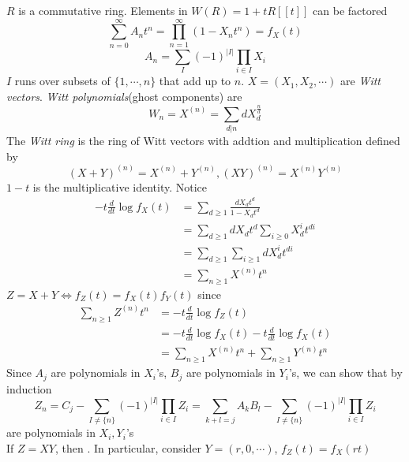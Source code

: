 \documentclass[main]{subfiles}
\begin{document}
\begin{definition}
$R$ is a commutative ring. Elements in $W(R)=1+tR[[t]]$ can be factored
\[\sum_{n=0}^\infty A_nt^n=\prod_{n=1}^\infty(1-X_nt^n)=f_X(t)\]
\[A_n=\sum_{I}(-1)^{|I|}\prod_{i\in I}X_i\]
$I$ runs over subsets of $\{1,\cdots,n\}$ that add up to $n$. $X=(X_1,X_2,\cdots)$ are \textit{Witt vectors}. \textit{Witt polynomials}(ghost components) are
\[W_n=X^{(n)}=\sum_{d|n}dX_d^{\frac{n}{d}}\]
The \textit{Witt ring} is the ring of Witt vectors with addtion and multiplication defined by
\[(X+Y)^{(n)}=X^{(n)}+Y^{(n)},(XY)^{(n)}=X^{(n)}Y^{(n)}\]
$1-t$ is the multiplicative identity. Notice
\begin{align*}
-t\frac{d}{dt}\log f_X(t)&=\sum_{d\geq1}\frac{dX_dt^d}{1-X_dt^d} \\
&=\sum_{d\geq1}dX_dt^d\sum_{i\geq0}X_d^it^{di} \\
&=\sum_{d\geq1}\sum_{i\geq1}dX_d^it^{di} \\
&=\sum_{n\geq1}X^{(n)}t^n
\end{align*}
$Z=X+Y\iff f_Z(t)=f_X(t)f_Y(t)$ since
\begin{align*}
\sum_{n\geq1}Z^{(n)}t^n&=-t\frac{d}{dt}\log f_Z(t) \\
&=-t\frac{d}{dt}\log f_X(t)-t\frac{d}{dt}\log f_X(t) \\
&=\sum_{n\geq1}X^{(n)}t^n+\sum_{n\geq1}Y^{(n)}t^n
\end{align*}
Since $A_j$ are polynomials in $X_i$'s, $B_j$ are polynomials in $Y_i$'s, we can show that by induction
\[Z_n=C_j-\sum_{I\neq\{n\}}(-1)^{|I|}\prod_{i\in I}Z_i=\sum_{k+l=j}A_kB_l-\sum_{I\neq\{n\}}(-1)^{|I|}\prod_{i\in I}Z_i\]
are polynomials in $X_i,Y_i$'s \\
If $Z=XY$, then . In particular, consider $Y=(r,0,\cdots)$, $f_Z(t)=f_X(rt)$ 
\end{definition}
\end{document}
